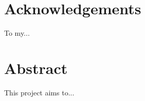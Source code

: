 \documentclass[a4paper,12pt,bibtotoc,notitlepage,oneside]{book}
\numberwithin{equation}{section}  %
\numberwithin{figure}{chapter}    %
\begin{document}




\chapter{Acknowledgements}
To my...



\chapter{Abstract}
{This project aims to...}

\mainmatter

\linespread{1.3} %




%
%
%
%



\backmatter
\end{document}
